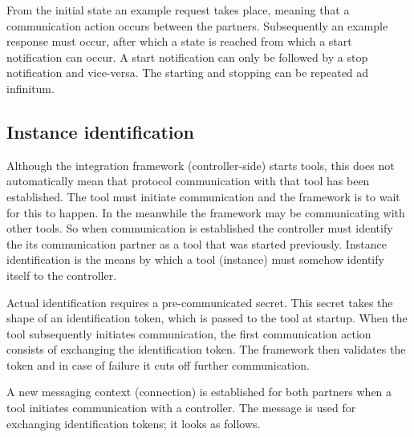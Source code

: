 \documentclass{article}
\begin{document}
   \noindent From the initial state an example request takes place, meaning that a
   communication action occurs between the partners. Subsequently an example
   response must occur, after which a state is reached from which a start
   notification can occur. A start notification can only be followed by a stop
   notification and vice-versa. The starting and stopping can be repeated ad
   infinitum.

  \subsection{Instance identification} \label{s:instance_identification}

   Although the integration framework (controller-side) starts tools, this
   does not automatically mean that protocol communication with that tool has
   been established. The tool must initiate communication and the framework is
   to wait for this to happen. In the meanwhile the framework may be
   communicating with other tools. So when communication is established the
   controller must identify the its communication partner as a tool that was
   started previously. Instance identification is the means by which a tool
   (instance) must somehow identify itself to the controller.

   Actual identification requires a pre-communicated secret. This secret takes
   the shape of an identification token, which is passed to the tool at
   startup.  When the tool subsequently initiates communication, the first
   communication action consists of exchanging the identification token. The
   framework then validates the token and in case of failure it cuts off
   further communication.

   A new messaging context (connection) is established for both partners when a
   tool initiates communication with a controller. The  message is used for exchanging identification tokens; it looks
   as follows.
\end{document}
